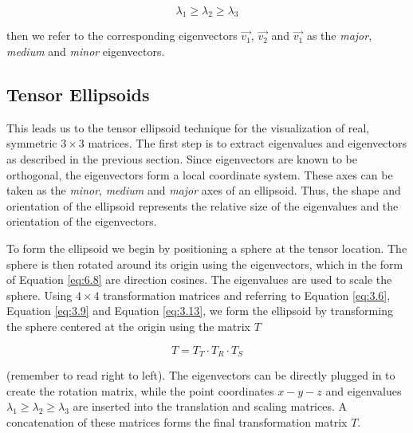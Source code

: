 \begin{equation}\label{eq:6.9}
\lambda{_1} \geq \lambda{_2} \geq \lambda{_3}
\end{equation}

then we refer to the corresponding eigenvectors $\vec{v_1}$, $\vec{v_2}$ and $\vec{v_1}$ as the \emph{major}, \emph{medium} and \emph{minor} eigenvectors.

\subsection{Tensor Ellipsoids}

This leads us to the tensor ellipsoid technique for the visualization of real, symmetric $3 \times 3$ matrices. The first step is to extract eigenvalues and eigenvectors as described in the previous section. Since eigenvectors are known to be orthogonal, the eigenvectors form a local coordinate system. These axes can be taken as the \emph{minor}, \emph{medium} and \emph{major} axes of an ellipsoid. Thus, the shape and orientation of the ellipsoid represents the relative size of the eigenvalues and the orientation of the eigenvectors.

To form the ellipsoid we begin by positioning a sphere at the tensor location. The sphere is then rotated around its origin using the eigenvectors, which in the form of Equation \ref{eq:6.8} are direction cosines. The eigenvalues are used to scale the sphere. Using $4 \times 4$ transformation matrices and referring to Equation \ref{eq:3.6}, Equation \ref{eq:3.9} and Equation \ref{eq:3.13}, we form the ellipsoid by transforming the sphere centered at the origin using the matrix $T$

\begin{equation}\label{eq:6.10}
T = T_T \cdot T_R \cdot T_S
\end{equation}

(remember to read right to left). The eigenvectors can be directly plugged in to create the rotation matrix, while the point coordinates $x-y-z$ and eigenvalues $\lambda{_1} \geq \lambda{_2} \geq \lambda{_3}$ are inserted into the translation and scaling matrices. A concatenation of these matrices forms the final transformation matrix $T$.


